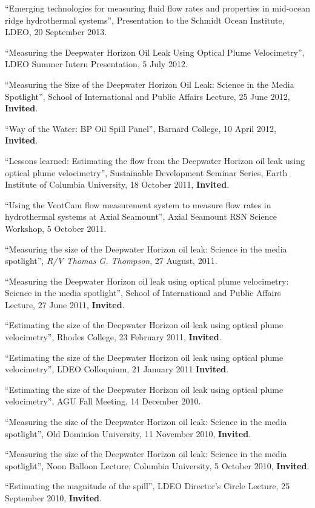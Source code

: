 \documentclass[11pt]{res}
\begin{document}
\begin{resume}
``Emerging technologies for measuring fluid flow rates and properties in mid-ocean ridge hydrothermal systems'', Presentation to the Schmidt Ocean Institute, LDEO, 20 September 2013.

``Measuring the Deepwater Horizon Oil Leak Using Optical Plume Velocimetry'', LDEO Summer Intern Presentation, 5 July 2012.

``Measuring the Size of the Deepwater Horizon Oil Leak: Science in the Media Spotlight'', School of International and Public Affairs Lecture, 25 June 2012, {\bf Invited}.

``Way of the Water: BP Oil Spill Panel'', Barnard College, 10 April 2012, {\bf Invited}.

``Lessons learned: Estimating the flow from the Deepwater Horizon oil leak using optical plume velocimetry'', Sustainable Development Seminar Series, Earth Institute of Columbia University, 18 October 2011, {\bf Invited}.

``Using the VentCam flow measurement system to measure flow rates in hydrothermal systems at Axial Seamount'', Axial Seamount RSN Science Workshop, 5 October 2011. 

``Measuring the size of the Deepwater Horizon oil leak: Science in the media spotlight'', {\em R/V Thomas G. Thompson}, 27 August, 2011.

``Measuring the Deepwater Horizon oil leak using optical plume velocimetry: Science in the media spotlight'', School of International and Public Affairs Lecture, 27 June 2011, {\bf Invited}.

``Estimating the size of the Deepwater Horizon oil leak using optical plume velocimetry'', Rhodes College, 23 February 2011, {\bf Invited}.

``Estimating the size of the Deepwater Horizon oil leak using optical plume velocimetry'', LDEO Colloquium, 21 January 2011 {\bf Invited}.

``Estimating the size of the Deepwater Horizon oil leak using optical plume velocimetry'', AGU Fall Meeting, 14 December 2010.

``Measuring the size of the Deepwater Horizon oil leak: Science in the media spotlight'', Old Dominion University, 11 November 2010, {\bf Invited}.

``Measuring the size of the Deepwater Horizon oil leak: Science in the media spotlight'', Noon Balloon Lecture, Columbia University, 5 October 2010, {\bf Invited}.

``Estimating the magnitude of the spill'', LDEO Director's Circle Lecture, 25 September 2010, {\bf Invited}.


\end{resume}
\end{document}

